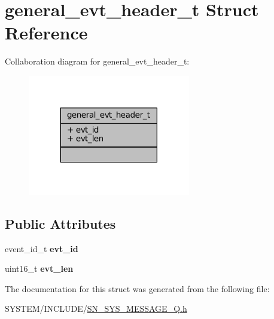 \hypertarget{structgeneral__evt__header__t}{}\section{general\+\_\+evt\+\_\+header\+\_\+t Struct Reference}
\label{structgeneral__evt__header__t}


Collaboration diagram for general\+\_\+evt\+\_\+header\+\_\+t\+:\nopagebreak
\begin{figure}[H]
\begin{center}
\leavevmode
\includegraphics[width=201pt]{structgeneral__evt__header__t__coll__graph}
\end{center}
\end{figure}
\subsection*{Public Attributes}
\begin{DoxyCompactItemize}
\item 
\mbox{\label{structgeneral__evt__header__t_a0c390623e81903c815f6ffef78051b97}} 
event\+\_\+id\+\_\+t {\bfseries evt\+\_\+id}
\item 
\mbox{\label{structgeneral__evt__header__t_a591744f9ad15d68ffa15083793ea5140}} 
uint16\+\_\+t {\bfseries evt\+\_\+len}
\end{DoxyCompactItemize}


The documentation for this struct was generated from the following file\+:\begin{DoxyCompactItemize}
\item 
S\+Y\+S\+T\+E\+M/\+I\+N\+C\+L\+U\+D\+E/\hyperlink{SN__SYS__MESSAGE__Q_8h}{S\+N\+\_\+\+S\+Y\+S\+\_\+\+M\+E\+S\+S\+A\+G\+E\+\_\+\+Q.\+h}\end{DoxyCompactItemize}
